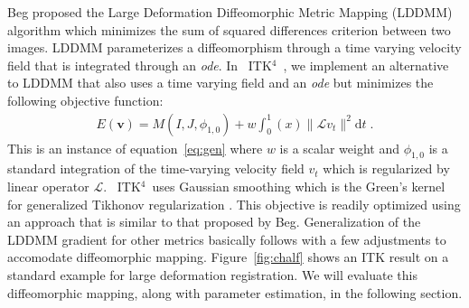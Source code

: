 \documentclass{llncs}
\newcommand{\vect}[1]{\mathbf{#1}}
\renewcommand{\v}{\vect{v}}
\newcommand{\myphi}{\phi}
\newcommand{\dd}{\text{d}}
\newcommand{\myE}{E}
\newcommand{\opL}{\mathcal{L}}
\newcommand{\tk}{~ITK$^{\text{4}}$~}
\begin{document}
Beg proposed the Large Deformation Diffeomorphic Metric Mapping
(LDDMM) algorithm \cite{Miller2005} which minimizes the sum of squared differences
criterion between two images.  LDDMM parameterizes a
diffeomorphism through a time varying velocity field that is
integrated through an {\em ode}.  In \tk, we implement an alternative
to LDDMM that also uses a time varying field and an {\em ode} but minimizes
the following objective function:
\begin{align}
\myE(\v) = M(I,J,\myphi_{1,0})
+  w \int_{0}^{1}(x) \| \opL v_t\|^2 \dd t \;.
\label{eq:lddmm}
\end{align}
This is an instance of equation~\ref{eq:gen} where $w$ is a scalar
weight and $\myphi_{1,0}$ is a standard integration of the
time-varying velocity field $v_t$ which is regularized by linear
operator $\opL$.  \tk uses Gaussian smoothing which is the Green's
kernel for generalized Tikhonov regularization \cite{Nielsen1997}.
This objective is readily optimized using an approach that is similar
to that proposed by Beg.  Generalization of the LDDMM gradient 
for other metrics basically follows \cite{hermosillo} with a few
adjustments to accomodate diffeomorphic mapping.
Figure~\ref{fig:chalf} shows an ITK result on a standard example for large
deformation registration.  We will evaluate this diffeomorphic
mapping, along with parameter estimation, in the following section.
\end{document}
